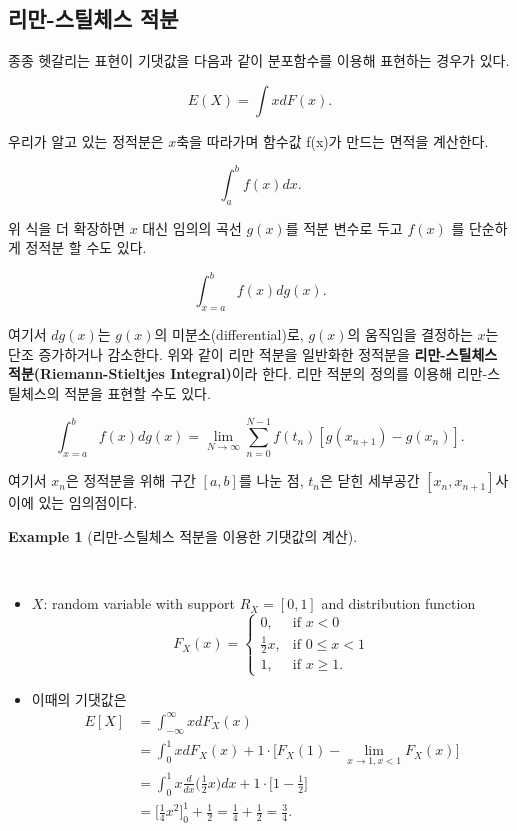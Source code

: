 \documentclass[
  13pt,
  letterpaper,
  DIV=11,
  numbers=noendperiod]{scrreprt}
\theoremstyle{definition}
\theoremstyle{plain}
\theoremstyle{definition}
\theoremstyle{plain}
\theoremstyle{plain}
\theoremstyle{definition}
\newtheorem{example}{Example}[chapter]
\theoremstyle{remark}
\begin{document}
\subsection{리만-스틸체스
적분}\label{uxb9acuxb9cc-uxc2a4uxd2f8uxccb4uxc2a4-uxc801uxbd84}

종종 헷갈리는 표현이 기댓값을 다음과 같이 분포함수를 이용해 표현하는
경우가 있다.

\[
E(X) = \int x dF(x).
\]

우리가 알고 있는 정적분은 \(x\)축을 따라가며 함수값 f(x)가 만드는 면적을
계산한다.

\[
\int_a^b f(x) dx.
\]

위 식을 더 확장하면 \(x\) 대신 임의의 곡선 \(g(x)\)를 적분 변수로 두고
\(f(x)\) 를 단순하게 정적분 할 수도 있다.

\[
\int_{x=a}^b f(x) dg(x).
\]

여기서 \(dg(x)\)는 \(g(x)\)의 미분소(differential)로, \(g(x)\)의
움직임을 결정하는 \(x\)는 단조 증가하거나 감소한다. 위와 같이 리만
적분을 일반화한 정적분을 \textbf{리만-스틸체스 적분(Riemann-Stieltjes
Integral)}이라 한다. 리만 적분의 정의를 이용해 리만-스틸체스의 적분을
표현할 수도 있다.

\[
\int_{x=a}^b f(x) dg(x) = \lim_{N\rightarrow \infty} \sum_{n=0}^{N-1} f(t_n) [g(x_{n+1}) - g(x_n)].
\]

여기서 \(x_n\)은 정적분을 위해 구간 \([a,b]\)를 나눈 점, \(t_n\)은 닫힌
세부공간 \([x_n, x_{n+1} ]\)사이에 있는 임의점이다.

\begin{example}[리만-스틸체스 적분을 이용한 기댓값의
계산]\protect\hypertarget{exm-riemmanstieltjesint01}{}\label{exm-riemmanstieltjesint01}

~

\begin{itemize}
\item
  \(X\): random variable with support \(R_X = [0,1]\) and distribution
  function \[
  F_X(x) = \begin{cases}
  0, &\text{if } x <0\\
  \frac{1}{2}x, &\text{if } 0 \leq x < 1\\
  1, &\text{if } x \geq 1.
  \end{cases}
  \]
\item
  이때의 기댓값은 \[
  \begin{align*}
  E[X] &= \int_{-\infty}^{\infty} x dF_X(x)\\
  &= \int_0^1 xdF_{X}(x) + 1\cdot \Big[ F_X(1) -\lim_{x\rightarrow 1, x < 1}F_X(x) \Big]\\
  &= \int_0^1 x \frac{d}{dx} \Big(\frac{1}{2}x \Big) dx  + 1 \cdot \Big[ 1- \frac{1}{2} \Big]\\
  &= \Big[\frac{1}{4}x^2 \Big]_{0}^1 + \frac{1}{2} = \frac{1}{4}+\frac{1}{2}=\frac{3}{4}.
  \end{align*}
  \]
\end{itemize}

\end{example}
\end{document}
